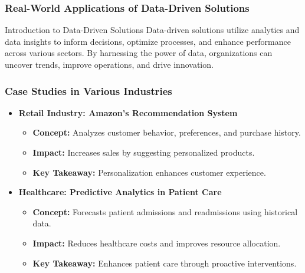 \documentclass[aspectratio=169]{beamer}
\begin{document}
\begin{frame}[fragile]
    \frametitle{Real-World Applications of Data-Driven Solutions}
    \begin{block}{Introduction to Data-Driven Solutions}
        Data-driven solutions utilize analytics and data insights to inform decisions, optimize processes, and enhance performance across various sectors. By harnessing the power of data, organizations can uncover trends, improve operations, and drive innovation.
    \end{block}
\end{frame}

\begin{frame}[fragile]
    \frametitle{Case Studies in Various Industries}
    \begin{itemize}
        \item \textbf{Retail Industry: Amazon's Recommendation System}
            \begin{itemize}
                \item \textbf{Concept:} Analyzes customer behavior, preferences, and purchase history.
                \item \textbf{Impact:} Increases sales by suggesting personalized products.
                \item \textbf{Key Takeaway:} Personalization enhances customer experience.
            \end{itemize}
        \item \textbf{Healthcare: Predictive Analytics in Patient Care}
            \begin{itemize}
                \item \textbf{Concept:} Forecasts patient admissions and readmissions using historical data.
                \item \textbf{Impact:} Reduces healthcare costs and improves resource allocation.
                \item \textbf{Key Takeaway:} Enhances patient care through proactive interventions.
            \end{itemize}
    \end{itemize}
\end{frame}
\end{document}
